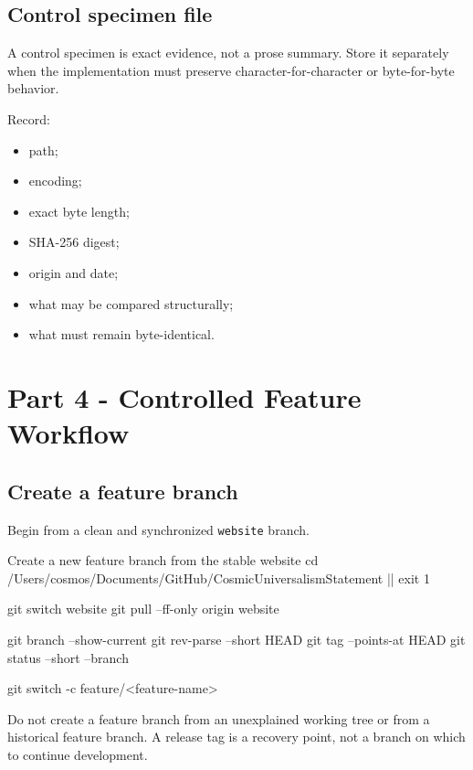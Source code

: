 \documentclass[11pt,letterpaper]{article}
\newcommand{\branchname}[1]{\texttt{#1}}
\begin{document}
\subsection{Control specimen file}

A control specimen is exact evidence, not a prose summary. Store it separately
when the implementation must preserve character-for-character or byte-for-byte
behavior.

Record:

\begin{itemize}
    \item path;
    \item encoding;
    \item exact byte length;
    \item SHA-256 digest;
    \item origin and date;
    \item what may be compared structurally;
    \item what must remain byte-identical.
\end{itemize}

\section{Part 4 - Controlled Feature Workflow}

\subsection{Create a feature branch}

Begin from a clean and synchronized \branchname{website} branch.

\begin{commandbox}{Create a new feature branch from the stable website}
cd /Users/cosmos/Documents/GitHub/CosmicUniversalismStatement || exit 1

git switch website
git pull --ff-only origin website

git branch --show-current
git rev-parse --short HEAD
git tag --points-at HEAD
git status --short --branch

git switch -c feature/<feature-name>
\end{commandbox}

\begin{safetybox}
Do not create a feature branch from an unexplained working tree or from a
historical feature branch. A release tag is a recovery point, not a branch on
which to continue development.
\end{safetybox}
\end{document}
